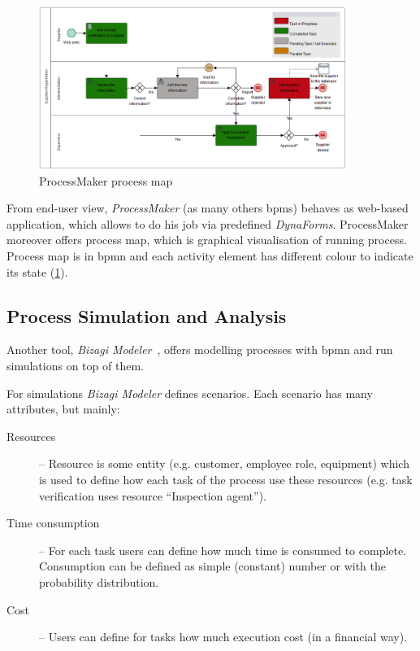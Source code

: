  \begin{figure}[ht!]
	\centering
    \includegraphics[width=10cm, keepaspectratio]{img/process-maker-map.PNG}
    \caption{ProcessMaker process map \cite{processmaker}}
    \label{fig:process-maker-process-map}
\end{figure} 
 
 From end-user view, \textit{ProcessMaker} (as many others \gls{bpms}) behaves as web-based application, which allows to do his job via predefined \textit{DynaForms}. ProcessMaker moreover offers process map, which is graphical visualisation of running process. Process map is in \gls{bpmn} and each activity element has different colour to indicate its state (\cref{fig:process-maker-process-map}).
\subsection{Process Simulation and Analysis}
Another tool, \textit{Bizagi Modeler}~\cite{bizagi-modeler-overview}, offers modelling processes with \gls{bpmn} and run simulations on top of them.

For simulations \textit{Bizagi Modeler} defines scenarios. Each scenario has many attributes, but mainly:
\begin{description}
    \item[Resources] -- Resource is some entity (e.g. customer, employee role, equipment) which is used to define how each task of the process use these resources (e.g. task verification uses resource ``Inspection agent'').
    \item[Time consumption] -- For each task users can define how much time is consumed to complete. Consumption can be defined as simple (constant) number or with the probability distribution.
    \item[Cost] -- Users can define for tasks how much execution cost (in a financial way).    
\end{description}

